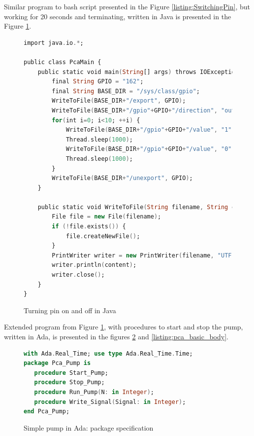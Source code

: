 Similar program to bash script presented in the Figure \ref{listing:SwitchingPin}, but working for 20 seconds and terminating, written in Java is presented in the Figure \ref{listing:pca_java}. 

\begin{figure}
\singlespacing
\begin{lstlisting}[language=ada, frame=single, gobble=0]
import java.io.*;

public class PcaMain {
	public static void main(String[] args) throws IOException, InterruptedException {
		final String GPIO = "162";
		final String BASE_DIR = "/sys/class/gpio";			
		WriteToFile(BASE_DIR+"/export", GPIO);
		WriteToFile(BASE_DIR+"/gpio"+GPIO+"/direction", "out");			
		for(int i=0; i<10; ++i) {
            WriteToFile(BASE_DIR+"/gpio"+GPIO+"/value", "1");
            Thread.sleep(1000);
			WriteToFile(BASE_DIR+"/gpio"+GPIO+"/value", "0");
            Thread.sleep(1000);
		}			
		WriteToFile(BASE_DIR+"/unexport", GPIO);
	}
	
	public static void WriteToFile(String filename, String content) throws IOException {
		File file = new File(filename);			 
		if (!file.exists()) {
			file.createNewFile();
		}
		PrintWriter writer = new PrintWriter(filename, "UTF-8");
		writer.println(content);
		writer.close();
	}
}
\end{lstlisting} 
\doublespacing
\caption{Turning pin on and off in Java}
\label{listing:pca_java}
\end{figure}

Extended program from Figure \ref{listing:pca_java}, with procedures to start and stop the pump, written in Ada, is presented in the figures \ref{listing:pca_basic_spec} and \ref{listing:pca_basic_body}.

\begin{figure}
\singlespacing
\begin{lstlisting}[language=ada, frame=single, gobble=0]
with Ada.Real_Time; use type Ada.Real_Time.Time;
package Pca_Pump is   
   procedure Start_Pump;
   procedure Stop_Pump;
   procedure Run_Pump(N: in Integer);
   procedure Write_Signal(Signal: in Integer);
end Pca_Pump;
\end{lstlisting}
\doublespacing
\caption{Simple pump in Ada: package specification}
\label{listing:pca_basic_spec}
\end{figure}

